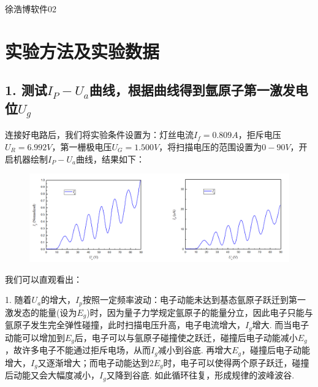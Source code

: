\documentclass[UTF8]{ctexart}
\begin{document}
\renewcommand{\thefootnote}{\fnsymbol{footnote}}
\linespread{1.4}
\title{\vspace{-5em}\vspace{-2.5em}}
\date{}
\maketitle
\begin{center}
{\fangsong 徐浩博\quad 软件02}
\end{center}

\section{实验方法及实验数据}
\subsection*{1. 测试$I_P-U_a$曲线，根据曲线得到氩原子第一激发电位$U_g$}
连接好电路后，我们将实验条件设置为：灯丝电流$I_f=0.809A$，拒斥电压$U_R=6.992V$，第一栅极电压$U_G=1.500V$，将扫描电压的范围设置为$0-90V$，开启机器绘制$I_P-U_a$曲线，结果如下：
\vspace{-2em}
\begin{center}
\begin{figure}[H]
    \includegraphics[scale=0.5]{1.png}\\
    \vspace{-3em}
\end{figure}
\end{center}
\vspace{-4em}
我们可以直观看出：\par
1. 随着$U_a$的增大，$I_p$按照一定频率波动：电子动能未达到基态氩原子跃迁到第一激发态的能量(设为$E_g$)时，因为量子力学规定氩原子的能量分立，因此电子只能与氩原子发生完全弹性碰撞，此时扫描电压升高，电子电流增大，$I_g$增大. 而当电子动能可以增加到$E_g$后，电子可以与氩原子碰撞使之跃迁，碰撞后电子动能减小$E_g$，故许多电子不能通过拒斥电场，从而$I_g$减小到谷底. 再增大$E_g$，碰撞后电子动能增大，$I_g$又逐渐增大；而电子动能达到$2E_g$时，电子可以使得两个原子跃迁，碰撞后动能又会大幅度减小，$I_g$又降到谷底. 如此循环往复，形成规律的波峰波谷. \par
\end{document}
